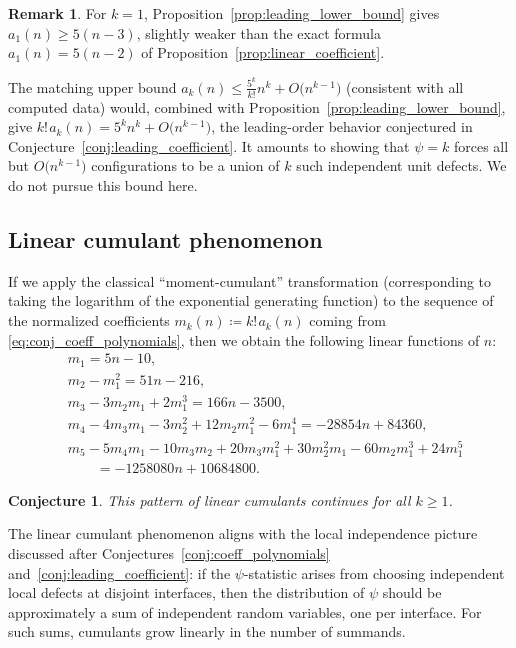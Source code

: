 \documentclass[pdftex]{sigma}
\numberwithin{equation}{section}
\newcommand{\ssp}{\hspace{1pt}}
\newtheorem{Conjecture}[Theorem]{Conjecture}
\theoremstyle{definition}
\newtheorem{Remark}[Theorem]{Remark}
\begin{document}
\begin{Remark}
	\label{rem:leading_lower_bound}
	For $k=1$,
	Proposition~\ref{prop:leading_lower_bound}
	gives $a_1(n)\ge 5(n-3)$, slightly
	weaker than the exact formula $a_1(n)=5(n-2)$ of Proposition~\ref{prop:linear_coefficient}.

	The matching upper bound $a_k(n)\le\frac{5^k}{k!}n^k+O\bigl(n^{k-1}\bigr)$
	(consistent with all computed data) would, combined with
	Proposition~\ref{prop:leading_lower_bound}, give
	$k!\ssp a_k(n)=5^{k}n^{k}+O\bigl(n^{k-1}\bigr)$, the leading-order behavior
	conjectured in Conjecture~\ref{conj:leading_coefficient}. It amounts to showing that
	$\psi=k$ forces all but $O\bigl(n^{k-1}\bigr)$ configurations to be a union of $k$
	such independent unit defects.
	We do not pursue this bound here.
\end{Remark}

\subsection{Linear cumulant phenomenon}
\label{subsec:linear_cumulant_phenomenon}

If we apply the classical ``moment-cumulant'' transformation (corresponding to
taking the logarithm of the exponential generating function) to the sequence of
the normalized coefficients $m_k(n)\coloneqq k!\ssp a_k(n)$ coming from
\eqref{eq:conj_coeff_polynomials}, then we obtain the following linear functions
of $n$:
\begin{equation*}
	\begin{split}
		&m_1=5n-10,\\
		&m_2-m_1^2=51n-216,\\
		&m_3-3m_2m_1+2m_1^3
=166n-3500,\\
		&m_4 -4m_3m_1-3m_2^2+12m_2m_1^2-6m_1^4
=-28854n+84360,\\
		&m_5 -5m_4m_1-10m_3m_2+ 20m_3m_1^2+30m_2^2m_1-60m_2m_1^3+24m_1^5\\
&\qquad = -
		1258080 n +10684800 .
	\end{split}
\end{equation*}

\begin{Conjecture}
	\label{conj:linear_cumulants}
	This pattern of linear cumulants continues for all $k\ge1$.
\end{Conjecture}

The linear cumulant phenomenon aligns with the local independence picture
discussed after Conjectures~\ref{conj:coeff_polynomials} and~\ref{conj:leading_coefficient}: if the
$\psi$-statistic arises from choosing independent local defects at disjoint
interfaces, then the distribution of $\psi$ should be approximately a sum of
independent random variables, one per interface.
For such sums, cumulants grow linearly in the number of summands.
\end{document}
